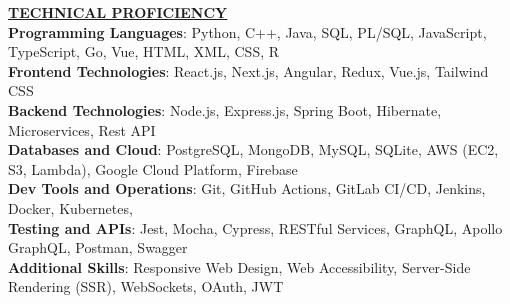 \documentclass{article}
\begin{document}
\noindent \textbf{\underline{TECHNICAL PROFICIENCY}} \\
\textbf{Programming Languages}{: \small Python, C++, Java, SQL, PL/SQL, JavaScript, TypeScript, Go, Vue, HTML, XML, CSS, R} \\
\textbf{Frontend Technologies}{: \small React.js, Next.js, Angular, Redux, Vue.js, Tailwind CSS} \\
\textbf{Backend Technologies}{: \small Node.js, Express.js, Spring Boot, Hibernate, Microservices, Rest API} \\
\textbf{Databases and Cloud}{: \small PostgreSQL, MongoDB, MySQL, SQLite, AWS (EC2, S3, Lambda), Google Cloud Platform, Firebase} \\
\textbf{Dev Tools and Operations}{: \small Git, GitHub Actions, GitLab CI/CD, Jenkins, Docker, Kubernetes,} \\
\textbf{Testing and APIs}{: \small Jest, Mocha, Cypress, RESTful Services, GraphQL, Apollo GraphQL, Postman, Swagger} \\
\textbf{Additional Skills}{: \small Responsive Web Design, Web Accessibility, Server-Side Rendering (SSR), WebSockets, OAuth, JWT}
\vspace{2mm} 
\end{document}
